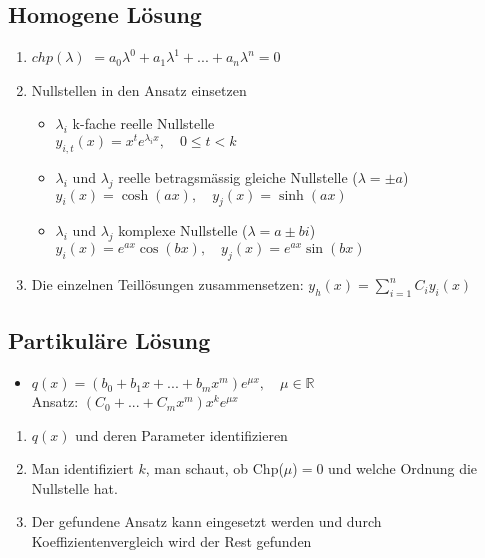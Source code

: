 \documentclass[a3paper, 11pt, landscape]{scrartcl}
\begin{document}
\begin{multicols*}{3}
	\subsection{Homogene Lösung}
	\begin{enumerate}
	    \item $chp(\lambda)$ $=a_0\lambda^0 + a_1\lambda^1 + ... + a_n\lambda^n=0$
	    \item Nullstellen in den Ansatz einsetzen
	    \begin{itemize}
	        \item $\lambda_i$ k-fache reelle Nullstelle \\
	        $y_{i,t}(x) = x^t e^{\lambda_i x}, \quad 0\leq t < k$
	        \item $\lambda_i$ und $\lambda_j$ reelle betragsmässig gleiche Nullstelle ($\lambda = \pm a$) \\
	        $y_i(x) = \cosh(ax),\quad y_j(x) = \sinh(ax)$
	        \item $\lambda_i$ und $\lambda_j$ komplexe Nullstelle ($\lambda = a \pm bi$) \\
	        $y_i(x) = e^{ax}\cos(bx), \quad y_j(x)=e^{ax}\sin(bx)$
	    \end{itemize} 
	    \item Die einzelnen Teillösungen zusammensetzen: $y_{h}(x)=\sum_{i=1}^{n} C_{i} y_{i}(x)$
	\end{enumerate}
	\subsection{Partikuläre Lösung}
	\begin{itemize}
	    \item $q(x) = (b_0 + b_1x + ... + b_mx^m)e^{\mu x}, \quad \mu \in \mathbb{R}$ \\
        Ansatz: $(C_0+...+C_mx^m)x^ke^{\mu x}$
	\end{itemize}
	\begin{enumerate}
	    \item $q(x)$ und deren Parameter identifizieren
	    \item Man identifiziert $k$, man schaut, ob Chp($\mu$)$=0$ und welche Ordnung die Nullstelle hat.
	    \item Der gefundene Ansatz kann eingesetzt werden und durch Koeffizientenvergleich wird der Rest gefunden
	\end{enumerate}

\end{multicols*}
\end{document}
